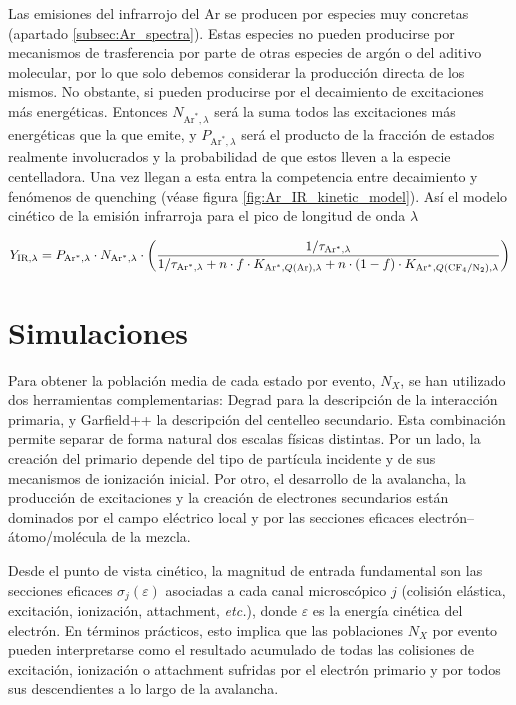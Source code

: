\documentclass[12pt,a4paper]{article}
\newcommand{\N}{\mathrm{N}}
\newcommand{\Ar}{\mathrm{Ar}}
\newcommand{\CF}{\mathrm{CF}}
\begin{document}
Las emisiones del infrarrojo del Ar se producen por especies muy concretas (apartado \ref{subsec:Ar_spectra}). Estas especies no pueden producirse por mecanismos de trasferencia por parte de otras especies de argón o del aditivo molecular, por lo que solo debemos considerar la producción directa de los mismos. No obstante, si pueden producirse por el decaimiento de excitaciones más energéticas. Entonces $ N_{\Ar^*,\lambda}$ será la suma todos las excitaciones más energéticas que la que emite, y $P_{\Ar^*,\lambda}$ será el producto de la fracción de estados realmente involucrados y la probabilidad de que estos lleven a la especie centelladora. Una vez llegan a esta entra la competencia entre decaimiento y fenómenos de quenching (véase figura \ref{fig:Ar_IR_kinetic_model}). Así el modelo cinético de la emisión infrarroja para el pico de longitud de onda $\lambda$

\begin{equation}
    Y_{\mathrm{IR},\lambda} = P_{\Ar^*,\lambda} \cdot N_{\Ar^*,\lambda}  \cdot \pqty{\frac{1 / \tau_{\Ar^*,\lambda}}{1 / \tau_{\Ar^*,\lambda} + n \cdot f \cdot  K_{\Ar^*, Q(\Ar), \lambda} + n \cdot(1-f) \cdot  K_{\Ar^*, Q(\CF_4/\N_2), \lambda}} }
\end{equation}

\section{Simulaciones} 

Para obtener la población media de cada estado por evento, \(N_X\), se han utilizado dos herramientas complementarias: Degrad para la descripción de la interacción primaria, y Garfield++ la descripción del centelleo secundario. Esta combinación permite separar de forma natural dos escalas físicas distintas. Por un lado, la creación del primario depende del tipo de partícula incidente y de sus mecanismos de ionización inicial. Por otro, el desarrollo de la avalancha, la producción de excitaciones y la creación de electrones secundarios están dominados por el campo eléctrico local y por las secciones eficaces electrón--átomo/molécula de la mezcla. 

Desde el punto de vista cinético, la magnitud de entrada fundamental son las secciones eficaces \(\sigma_j(\varepsilon)\) asociadas a cada canal microscópico \(j\) (colisión elástica, excitación, ionización, attachment, \emph{etc.}), donde \(\varepsilon\) es la energía cinética del electrón. En términos prácticos, esto implica que las poblaciones \(N_X\) por evento pueden interpretarse como el resultado acumulado de todas las colisiones de excitación, ionización o attachment sufridas por el electrón primario y por todos sus descendientes a lo largo de la avalancha.
\end{document}
